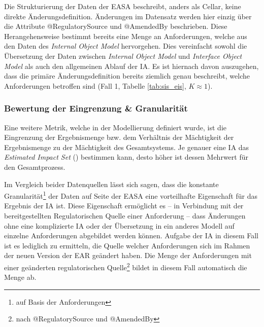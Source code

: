     \medskip
    Die Strukturierung der Daten der \ac{EASA} beschreibt, anders als Cellar, keine direkte Änderungsdefinition.
    Änderungen im Datensatz werden hier einzig über die Attribute @RegulatorySource und @AmendedBy beschrieben.
    Diese Herangehensweise bestimmt bereits eine Menge an Anforderungen, welche aus den Daten des \textit{Internal Object Model} hervorgehen.
    Dies vereinfacht sowohl die Übersetzung der Daten zwischen \textit{Internal Object Model} und \textit{Interface Object Model} als auch den allgemeinen Ablauf der \ac{IA}.
    Es ist hiernach davon auszugehen, dass die primäre Änderungsdefinition bereits ziemlich genau beschreibt, welche Anforderungen betroffen sind (Fall 1, Tabelle \ref{tab:sis_eis}, $K \approx  1$).

\subsubsection{Bewertung der Eingrenzung \& Granularität}
    
    Eine weitere Metrik, welche in der Modellierung definiert wurde, ist die Eingrenzung der Ergebnismenge bzw. dem Verhältnis der Mächtigkeit der Ergebnismenge zu der Mächtigkeit des Gesamtsystems.
    Je genauer eine \ac{IA} das \textit{Estimated Impact Set} () bestimmen kann, desto höher ist dessen Mehrwert für den Gesamtprozess.
    
    \medskip
    Im Vergleich beider Datenquellen lässt sich sagen, dass die konstante Granularität\footnote{auf Basis der Anforderungen} der Daten auf Seite der \ac{EASA} eine vorteilhafte Eigenschaft für das Ergebnis der \ac{IA} ist.
    Diese Eigenschaft ermöglicht es -- in Verbindung mit der bereitgestellten Regulatorischen Quelle einer Anforderung -- dass Änderungen ohne eine komplizierte \ac{IA} oder der Übersetzung in ein anderes Modell auf einzelne Anforderungen abgebildet werden können.
    Aufgabe der \ac{IA} in diesem Fall ist es lediglich zu ermitteln, die Quelle welcher Anforderungen sich im Rahmen der neuen Version der \ac{EAR} geändert haben.
    Die Menge der Anforderungen mit einer geänderten regulatorischen Quelle\footnote{nach @RegulatorySource und @AmendedBy} bildet in diesem Fall automatisch die Menge  ab.
    
